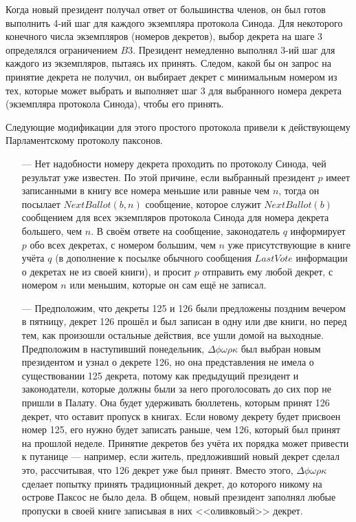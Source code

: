 \documentclass[12pt, a4paper]{article} %
\begin{document}
Когда новый президент получал ответ от большинства членов, он был готов выполнить 4-ий шаг для каждого экземпляра протокола Синода. Для некоторого конечного числа экземпляров (номеров декретов), выбор декрета на шаге 3 определялся ограничением $B3$. Президент немедленно выполнял 3-ий шаг для каждого из экземпляров, пытаясь их принять. Следом, какой бы он запрос на принятие декрета не получил, он выбирает декрет с минимальным номером из тех, которые может выбрать и выполняет шаг 3 для выбранного номера декрета (экземпляра протокола Синода), чтобы его принять.

Следующие модификации для этого простого протокола привели к действующему Парламентскому протоколу паксонов.

\begin{itemize}
    \item[---] Нет надобности номеру декрета проходить по протоколу Синода, чей результат уже известен. По этой причине, если выбранный президент $p$ имеет записанными в книгу все номера меньшие или равные чем $n$, тогда он посылает $NextBallot(b,n)$ сообщение, которое служит $NextBallot(b)$ сообщением для всех экземпляров протокола Синода для номера декрета большего, чем $n$. В своём ответе на сообщение, законодатель $q$ информирует $p$ обо всех декретах, с номером большим, чем $n$ уже присутствующие в книге учёта $q$ (в дополнение к посылке обычного сообщения $LastVote$ информации о декретах не из своей книги), и просит $p$ отправить ему любой декрет, с номером $n$ или меньшим, которые он сам ещё не записал.

    \item[---] Предположим, что декреты 125 и 126 были предложены поздним вечером в пятницу, декрет 126 прошёл и был записан в одну или две книги, но перед тем, как произошли остальные действия, все ушли домой на выходные. Предположим в наступивший понедельник, $\Delta\phi\omega\rho\kappa$ был выбран новым президентом и узнал о декрете 126, но она представления не имела о существовании 125 декрета, потому как предыдущий президент и законодатели, которые должны были за него проголосовать до сих пор не пришли в Палату. Она будет удерживать бюллетень, которым принят 126 декрет, что оставит пропуск в книгах. Если новому декрету будет присвоен номер 125, его нужно будет записать раньше, чем 126, который был принят на прошлой неделе. Принятие декретов без учёта их порядка может привести к путанице --- например, если житель, предложивший новый декрет сделал это, рассчитывая, что 126 декрет уже был принят. Вместо этого, $\Delta\phi\omega\rho\kappa$ сделает попытку принять 
традиционный декрет, до которого никому на острове Паксос не было дела. В общем, новый президент заполнял любые пропуски в своей книге записывая в них <<оливковый>> декрет.
\end{itemize}
\end{document}
